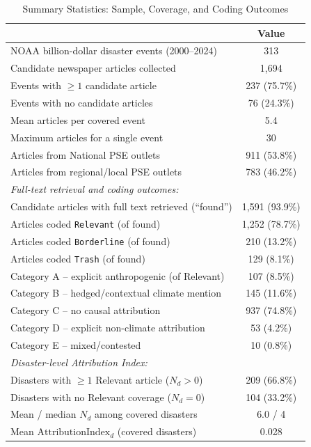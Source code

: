 \documentclass[12pt]{article}
\begin{document}
\begin{table}[ht]
\centering
\caption{Summary Statistics: Sample, Coverage, and Coding Outcomes}
\label{tab:summary_stats}
\begin{threeparttable}
\begin{tabular}{lc}
\toprule
 & Value \\
\midrule
NOAA billion-dollar disaster events (2000--2024) & 313 \\
Candidate newspaper articles collected & 1,694 \\
Events with $\geq 1$ candidate article & 237 (75.7\%) \\
Events with no candidate articles & 76 (24.3\%) \\
Mean articles per covered event & 5.4 \\
Maximum articles for a single event & 30 \\
Articles from National PSE outlets & 911 (53.8\%) \\
Articles from regional/local PSE outlets & 783 (46.2\%) \\
\midrule
\multicolumn{2}{l}{\emph{Full-text retrieval and coding outcomes:}} \\
Candidate articles with full text retrieved (``found'') & 1,591 (93.9\%) \\
Articles coded \texttt{Relevant} (of found) & 1,252 (78.7\%) \\
Articles coded \texttt{Borderline} (of found) & 210 (13.2\%) \\
Articles coded \texttt{Trash} (of found) & 129 (8.1\%) \\
\quad Category A -- explicit anthropogenic (of Relevant) & 107 (8.5\%) \\
\quad Category B -- hedged/contextual climate mention & 145 (11.6\%) \\
\quad Category C -- no causal attribution & 937 (74.8\%) \\
\quad Category D -- explicit non-climate attribution & 53 (4.2\%) \\
\quad Category E -- mixed/contested & 10 (0.8\%) \\
\midrule
\multicolumn{2}{l}{\emph{Disaster-level Attribution Index:}} \\
Disasters with $\geq 1$ Relevant article ($N_d > 0$) & 209 (66.8\%) \\
Disasters with no Relevant coverage ($N_d = 0$) & 104 (33.2\%) \\
Mean / median $N_d$ among covered disasters & 6.0 / 4 \\
Mean $\text{AttributionIndex}_d$ (covered disasters) & 0.028 \\

\end{tabular}
\end{threeparttable}
\end{table}
\end{document}
